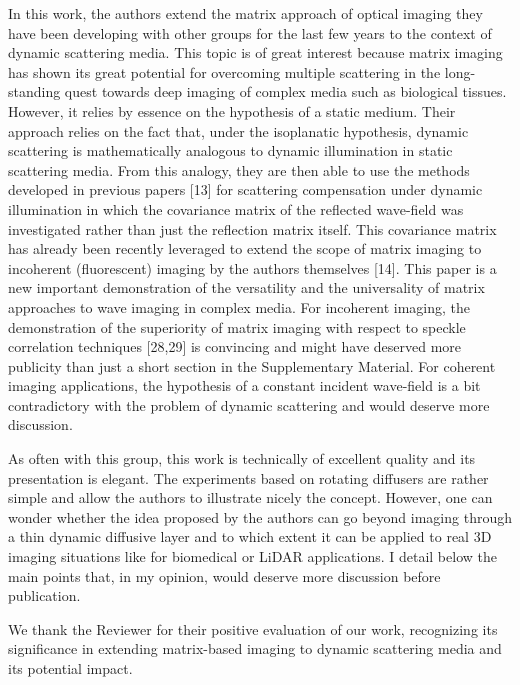 \documentclass[12pt]{article}
\newenvironment{ourresponse}
    {\begin{tcolorbox}[width=\linewidth,breakable,enhanced,colback=gray!5,colframe=responsecolor!50,title=Response,left=5pt,right=5pt]}
    {\end{tcolorbox}}
\begin{document}
In this work, the authors extend the matrix approach of optical imaging they have been developing with other groups for the last few years to the context of dynamic scattering media. This topic is of great interest because matrix imaging has shown its great potential for overcoming multiple scattering in the long-standing quest towards deep imaging of complex media such as biological tissues. However, it relies by essence on the hypothesis of a static medium. Their approach relies on the fact that, under the isoplanatic hypothesis, dynamic scattering is mathematically analogous to dynamic illumination in static scattering media. From this analogy, they are then able to use the methods developed in previous papers [13] for scattering compensation under dynamic illumination in which the covariance matrix of the reflected wave-field was investigated rather than just the reflection matrix itself. This covariance matrix has already been recently leveraged to extend the scope of matrix imaging to incoherent (fluorescent) imaging by the authors themselves [14]. This paper is a new important demonstration of the versatility and the universality of matrix approaches to wave imaging in complex media. For incoherent imaging, the demonstration of the superiority of matrix imaging with respect to speckle correlation techniques [28,29] is convincing and might have deserved more publicity than just a short section in the Supplementary Material. For coherent imaging applications, the hypothesis of a constant incident wave-field is a bit contradictory with the problem of dynamic scattering and would deserve more discussion.  

As often with this group, this work is technically of excellent quality and its presentation is elegant. The experiments based on rotating diffusers are rather simple and allow the authors to illustrate nicely the concept. However, one can wonder whether the idea proposed by the authors can go beyond imaging through a thin dynamic diffusive layer and to which extent it can be applied to real 3D imaging situations like for biomedical or LiDAR applications. I detail below the main points that, in my opinion, would deserve more discussion before publication.

\begin{ourresponse}
    We thank the Reviewer for their positive evaluation of our work, recognizing its significance in extending matrix-based imaging to dynamic scattering media and its potential impact.
\end{ourresponse}
\end{document}
